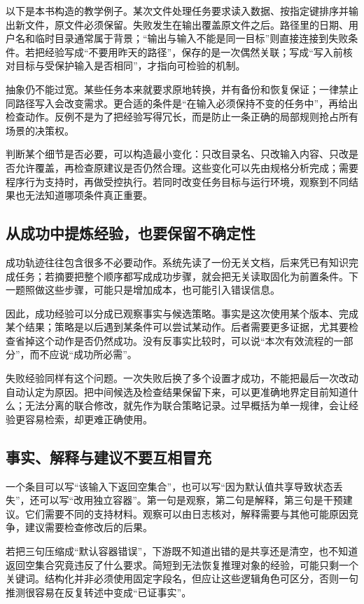 以下是本书构造的教学例子。某次文件处理任务要求读入数据、按指定键排序并输出新文件，原文件必须保留。失败发生在输出覆盖原文件之后。路径里的日期、用户名和临时目录通常属于背景；“输出与输入不能是同一目标”则直接连接到失败条件。若把经验写成“不要用昨天的路径”，保存的是一次偶然关联；写成“写入前核对目标与受保护输入是否相同”，才指向可检验的机制。

抽象仍不能过宽。某些任务本来就要求原地转换，并有备份和恢复保证；一律禁止同路径写入会改变需求。更合适的条件是“在输入必须保持不变的任务中”，再给出检查动作。反例不是为了把经验写得冗长，而是防止一条正确的局部规则抢占所有场景的决策权。

判断某个细节是否必要，可以构造最小变化：只改目录名、只改输入内容、只改是否允许覆盖，再检查原建议是否仍然合理。这些变化可以先由规格分析完成；需要程序行为支持时，再做受控执行。若同时改变任务目标与运行环境，观察到不同结果也无法知道哪项条件真正重要。

\subsection{从成功中提炼经验，也要保留不确定性}

成功轨迹往往包含很多不必要动作。系统先读了一份无关文档，后来凭已有知识完成任务；若摘要把整个顺序都写成成功步骤，就会把无关读取固化为前置条件。下一题照做这些步骤，可能只是增加成本，也可能引入错误信息。

因此，成功经验可以分成已观察事实与候选策略。事实是这次使用某个版本、完成某个结果；策略是以后遇到某条件可以尝试某动作。后者需要更多证据，尤其要检查省掉这个动作是否仍然成功。没有反事实比较时，可以说“本次有效流程的一部分”，而不应说“成功所必需”。

失败经验同样有这个问题。一次失败后换了多个设置才成功，不能把最后一次改动自动认定为原因。把中间候选及检查结果保留下来，可以更准确地界定目前知道什么；无法分离的联合修改，就先作为联合策略记录。过早概括为单一规律，会让经验更容易检索，却更难正确使用。

\subsection{事实、解释与建议不要互相冒充}

一个条目可以写“该输入下返回空集合”，也可以写“因为默认值共享导致状态丢失”，还可以写“改用独立容器”。第一句是观察，第二句是解释，第三句是干预建议。它们需要不同的支持材料。观察可以由日志核对，解释需要与其他可能原因竞争，建议需要检查修改后的后果。

若把三句压缩成“默认容器错误”，下游既不知道出错的是共享还是清空，也不知道返回空集合究竟违反了什么要求。简短到无法恢复推理对象的经验，可能只剩一个关键词。结构化并非必须使用固定字段名，但应让这些逻辑角色可区分，否则一句推测很容易在反复转述中变成“已证事实”。


